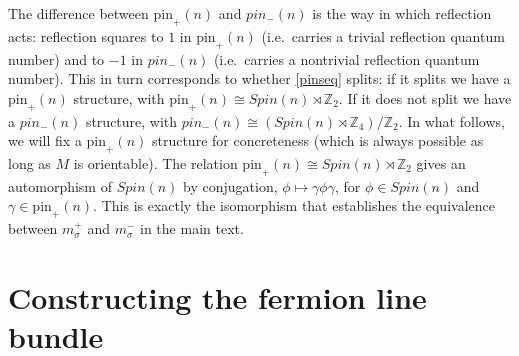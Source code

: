 \documentclass[12pt,a4paper]{article}
\newcommand{\zz}{\mathbb{Z}}
\newcommand{\zt}{\mathbb{Z}_2}
\newcommand\be            {\begin{equation}}
\newcommand\ee            {\end{equation}}
\newcommand{\pin}{\text{pin}}
\newcommand{\ethan}[1]{{\color{amethyst}\footnotesize{(EL) #1}}}
\begin{document}
The difference between $\pin_+(n)$ and $pin_-(n)$ is the way in which reflection acts: 
reflection squares to $1$ in $\pin_+(n)$ (i.e.\ carries a trivial reflection quantum number) 
and to $-1$ in $pin_-(n)$ (i.e.\ carries a nontrivial reflection quantum number). 
This in turn corresponds to whether \eqref{pinseq} splits: if it splits we have a $\pin_+(n)$ structure, 
with $\pin_+(n) \cong Spin(n) \rtimes \zt$. If it does not split we have a $pin_-(n)$ structure, 
with $pin_-(n) \cong (Spin(n) \rtimes \zz_4)/\zt$. In what follows, we will fix a $\pin_+(n)$ 
structure for concreteness (which is always possible as long as $M$ is orientable). 
The relation $\pin_+(n) \cong Spin(n) \rtimes \zt$ gives an automorphism of $Spin(n)$ by 
conjugation, $\phi \mapsto \gamma \phi \gamma$, for $\phi \in Spin(n)$ and $\gamma \in \pin_+(n)$. 
This is exactly the isomorphism that establishes the equivalence between $m_\sigma^+$ 
and $m_\sigma^-$ in the main text. 






\section{Constructing the fermion line bundle}
\label{fermion_line_bundle} \label{flb_appendix}
\end{document}
